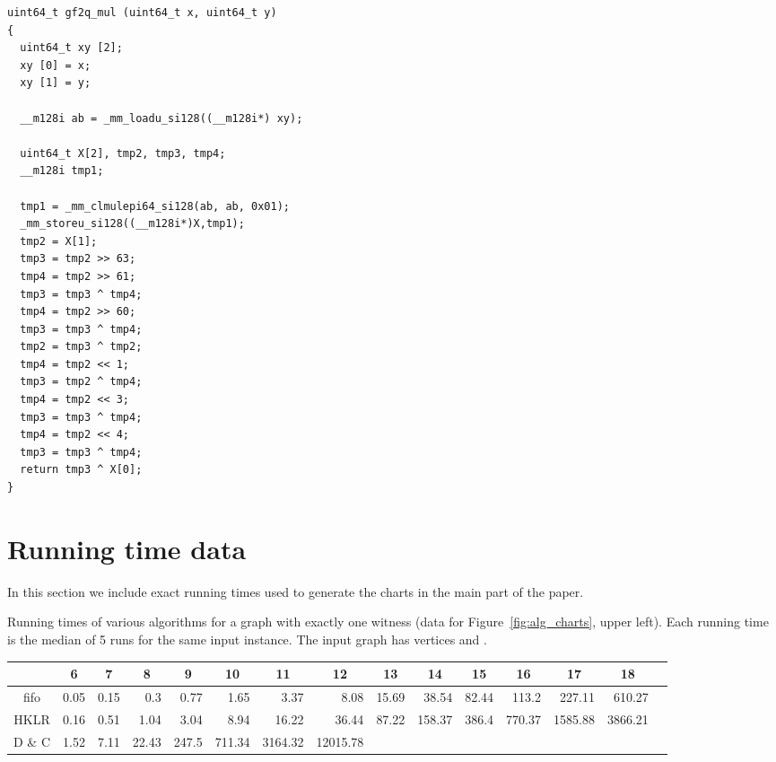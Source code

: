 \documentclass[11pt]{article}
\begin{document}
 {\footnotesize
 \begin{verbatim}
uint64_t gf2q_mul (uint64_t x, uint64_t y)
{
  uint64_t xy [2];
  xy [0] = x;
  xy [1] = y;

  __m128i ab = _mm_loadu_si128((__m128i*) xy);

  uint64_t X[2], tmp2, tmp3, tmp4;
  __m128i tmp1;
  
  tmp1 = _mm_clmulepi64_si128(ab, ab, 0x01);
  _mm_storeu_si128((__m128i*)X,tmp1);
  tmp2 = X[1];
  tmp3 = tmp2 >> 63;
  tmp4 = tmp2 >> 61;
  tmp3 = tmp3 ^ tmp4;
  tmp4 = tmp2 >> 60;
  tmp3 = tmp3 ^ tmp4;
  tmp2 = tmp3 ^ tmp2; 
  tmp4 = tmp2 << 1;
  tmp3 = tmp2 ^ tmp4;
  tmp4 = tmp2 << 3;
  tmp3 = tmp3 ^ tmp4;
  tmp4 = tmp2 << 4;
  tmp3 = tmp3 ^ tmp4;
  return tmp3 ^ X[0];
}
\end{verbatim}
}

          
\section{Running time data}

In this section we include exact running times used to generate the charts in the main part of the paper.

Running times of various algorithms for a graph with exactly one witness (data for Figure~\ref{fig:alg_charts}, upper left).
Each running time is the median of 5 runs for the same input instance.
The input graph has  vertices and .

{\scriptsize
\begin{center}
\begin{tabular}{|c|r@{\,}|r@{\,}|r@{\,}|r@{\,}|r@{\,}|r@{\,}|r@{\,}|r@{\,}|r@{\,}|r@{\,}|r@{\,}|r@{\,}|r@{\,}|r|}\hline
\multicolumn{1}{|c|}{} & \multicolumn{1}{|c|}{6}  & \multicolumn{1}{|c|}{7}  & \multicolumn{1}{|c|}{8}  & \multicolumn{1}{|c|}{9}  & \multicolumn{1}{|c|}{10}  & \multicolumn{1}{|c|}{11}  & \multicolumn{1}{|c|}{12}  & \multicolumn{1}{|c|}{13}  & \multicolumn{1}{|c|}{14}  & \multicolumn{1}{|c|}{15}  & \multicolumn{1}{|c|}{16}  & \multicolumn{1}{|c|}{17}  & \multicolumn{1}{|c|}{18} \\ \hline
fifo & 0.05 & 0.15 & 0.3 & 0.77 & 1.65 & 3.37 & 8.08 & 15.69 & 38.54 & 82.44 & 113.2 & 227.11 & 610.27\\
HKLR & 0.16 & 0.51 & 1.04 & 3.04 & 8.94 & 16.22 & 36.44 & 87.22 & 158.37 & 386.4 & 770.37 & 1585.88 & 3866.21\\
D \& C & 1.52 & 7.11 & 22.43 & 247.5 & 711.34 & 3164.32 & 12015.78 & & & & & & \\\hline
\end{tabular}
\end{center}
}
\end{document}
